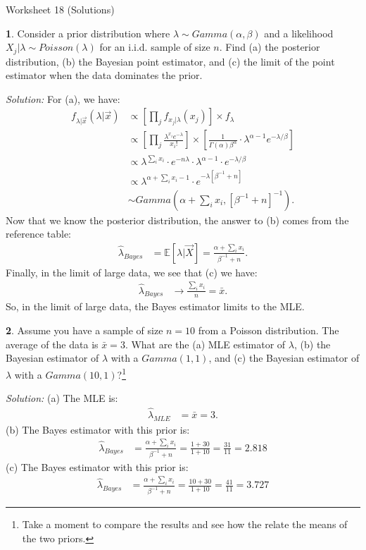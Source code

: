 \documentclass{tufte-handout}
\begin{document}
\justify

{\LARGE Worksheet 18 (Solutions)}

\vspace*{18pt}


\textbf{1}. Consider a prior distribution where $\lambda \sim Gamma(\alpha, \beta)$ and a 
likelihood $X_j|\lambda \sim Poisson(\lambda)$ for an i.i.d. sample of size $n$.
Find (a) the posterior distribution, (b) the Bayesian point estimator, and (c) the
limit of the point estimator when the data dominates the prior.

\textit{Solution:} For (a), we have:
\begin{align*}
f_{\lambda | \vec{x}}(\lambda | \vec{x}) 
&\propto \left[ \prod_j f_{x_j|\lambda}(x_j) \right] \times f_{\lambda} \\
&\propto \left[ \prod_j \frac{\lambda^{x_i} e^{-\lambda}}{x_i!} \right] \times \left[ \frac{1}{\Gamma(\alpha) \beta^{\alpha}} \cdot \lambda^{\alpha - 1} e^{-\lambda/\beta} \right] \\
&\propto \lambda^{\sum_i x_i} \cdot e^{-n\lambda} \cdot \lambda^{\alpha - 1} \cdot e^{-\lambda/\beta} \\
&\propto \lambda^{\alpha + \sum_i x_i - 1} \cdot e^{-\lambda [\beta^{-1} + n]} \\
&\sim Gamma(\alpha + \sum_i x_i, [\beta^{-1} + n]^{-1}).
\end{align*}
Now that we know the posterior distribution, the answer to (b) comes from the
reference table:
\begin{align*}
\hat{\lambda}_{Bayes} &= \mathbb{E}[ \lambda | \vec{X} ] = \frac{\alpha + \sum_i x_i}{\beta^{-1} + n}.
\end{align*}
Finally, in the limit of large data, we see that (c) we have:
\begin{align*}
\hat{\lambda}_{Bayes} &\rightarrow \frac{\sum_i x_i}{n} = \bar{x}.
\end{align*}
So, in the limit of large data, the Bayes estimator limits to the MLE.

\textbf{2}. Assume you have a sample of size $n = 10$ from a Poisson distribution. The 
average of the data is $\bar{x} = 3$. What are the (a) MLE estimator of $\lambda$,
(b) the Bayesian estimator of $\lambda$ with a $Gamma(1, 1)$, and (c) the
Bayesian estimator of $\lambda$ with a $Gamma(10, 1)$?\footnote{
  Take a moment to compare the results and see how the relate the means of the
  two priors.
}

\textit{Solution:} (a) The MLE is:
\begin{align*}
\hat{\lambda}_{MLE} &= \bar{x} = 3.
\end{align*}
(b) The Bayes estimator with this prior is:
\begin{align*}
\hat{\lambda}_{Bayes} &= \frac{\alpha + \sum_i x_i}{\beta^{-1} + n} = \frac{1 + 30}{1 + 10} = \frac{31}{11} = 2.818
\end{align*}
(c) The Bayes estimator with this prior is:
\begin{align*}
\hat{\lambda}_{Bayes} &= \frac{\alpha + \sum_i x_i}{\beta^{-1} + n} = \frac{10 + 30}{1 + 10} = \frac{41}{11} = 3.727
\end{align*}
\end{document}
